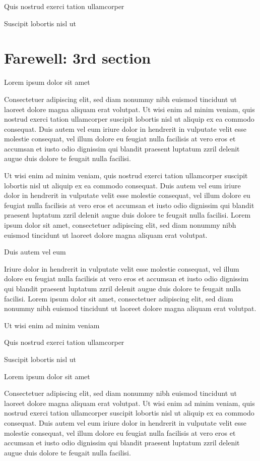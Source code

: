\documentclass[11pt,twoside]{article}\makeatletter
\makeatletter
\renewcommand\section{\@startsection {section}{1}{\z@}%
     {-1.75ex \@plus -0.5ex \@minus -.2ex}%
     {0.5ex \@plus .2ex}%
     {\reset@font\Large\bfseries\sffamily}}
\def\DivI{\section}
\def\DivI{\chapter}
\makeatother
\begin{document}
Quis nostrud exerci tation ullamcorper \par
Suscipit lobortis nisl ut 
\DivI[Farewell: 3rd section]{Farewell: 3rd section}\label{part3}\par
Lorem ipsum dolor sit amet\par
Consectetuer adipiscing elit, sed diam nonummy nibh euismod       tincidunt ut laoreet dolore magna aliquam erat volutpat. Ut wisi enim       ad minim veniam, quis nostrud exerci tation ullamcorper suscipit       lobortis nisl ut aliquip ex ea commodo consequat. Duis autem vel eum       iriure dolor in hendrerit in vulputate velit esse molestie consequat,       vel illum dolore eu feugiat nulla facilisis at vero eros et accumsan       et iusto odio dignissim qui blandit praesent luptatum zzril delenit       augue duis dolore te feugait nulla facilisi.\par
Ut wisi enim ad minim veniam, quis nostrud exerci tation       ullamcorper suscipit lobortis nisl ut aliquip ex ea commodo       consequat. Duis autem vel eum iriure dolor in hendrerit in vulputate       velit esse molestie consequat, vel illum dolore eu feugiat nulla       facilisis at vero eros et accumsan et iusto odio dignissim qui blandit       praesent luptatum zzril delenit augue duis dolore te feugait nulla       facilisi. Lorem ipsum dolor sit amet, consectetuer adipiscing elit,       sed diam nonummy nibh euismod tincidunt ut laoreet dolore magna       aliquam erat volutpat. \par
Duis autem vel eum \par
Iriure dolor in hendrerit in vulputate velit esse molestie       consequat, vel illum dolore eu feugiat nulla facilisis at vero eros et       accumsan et iusto odio dignissim qui blandit praesent luptatum zzril       delenit augue duis dolore te feugait nulla facilisi. Lorem ipsum dolor       sit amet, consectetuer adipiscing elit, sed diam nonummy nibh euismod       tincidunt ut laoreet dolore magna aliquam erat volutpat. \par
Ut wisi enim ad minim veniam\par
Quis nostrud exerci tation ullamcorper \par
Suscipit lobortis nisl ut \par
Lorem ipsum dolor sit amet\par
Consectetuer adipiscing elit, sed diam nonummy nibh euismod       tincidunt ut laoreet dolore magna aliquam erat volutpat. Ut wisi enim       ad minim veniam, quis nostrud exerci tation ullamcorper suscipit       lobortis nisl ut aliquip ex ea commodo consequat. Duis autem vel eum       iriure dolor in hendrerit in vulputate velit esse molestie consequat,       vel illum dolore eu feugiat nulla facilisis at vero eros et accumsan       et iusto odio dignissim qui blandit praesent luptatum zzril delenit       augue duis dolore te feugait nulla facilisi.\par
\end{document}
